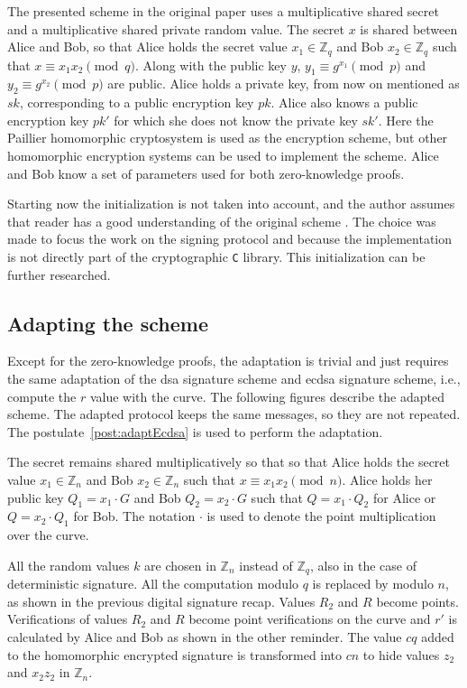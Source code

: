 The presented scheme in the original paper uses a multiplicative shared secret
and a multiplicative shared private random value. The secret $x$ is shared
between Alice and Bob, so that Alice holds the secret value $x_1 \in
\mathbb{Z}_{q}$ and Bob $x_2 \in \mathbb{Z}_{q}$ such that $x \equiv x_1x_2
\pmod q$. Along with the public key $y$, $y_1 \equiv g^{x_1} \pmod p$ and $y_2
\equiv g^{x_2} \pmod p$ are public. Alice holds a private key, from now on
mentioned as $sk$, corresponding to a public encryption key $pk$. Alice also
knows a public encryption key $pk'$ for which she does not know the private key
$sk'$. Here the Paillier homomorphic cryptosystem is used as the encryption
scheme, but other homomorphic encryption systems can be
used to implement the scheme. Alice and Bob know a set of parameters used for
both zero-knowledge proofs.

Starting now the initialization is not taken into account, and the author
assumes that reader has a good understanding of the original scheme
\cite{crypto-2001-1592}. The choice was made to focus the work on the
signing protocol and because the implementation is not directly part of the
cryptographic \texttt{C} library. This initialization can be further researched.

\subsection{Adapting the scheme}

Except for the zero-knowledge proofs, the adaptation is trivial and just requires
the same adaptation of the \gls{dsa} signature scheme and \gls{ecdsa} signature
scheme, i.e., compute the $r$ value with the curve. The following figures
describe the adapted scheme. The adapted protocol keeps the same messages, so
they are not repeated. The postulate~\ref{post:adaptEcdsa} is used to perform
the adaptation.

The secret remains shared multiplicatively so that so that Alice holds the secret
value $x_1 \in \mathbb{Z}_{n}$ and Bob $x_2 \in \mathbb{Z}_{n}$ such that $x
\equiv x_1x_2 \pmod n$. Alice holds her public key $Q_1 = x_1 \cdot G$ and Bob
$Q_2 = x_2 \cdot G$ such that $Q = x_1 \cdot Q_2$ for Alice or $Q = x_2 \cdot
Q_1$ for Bob. The notation $\cdot$ is used to denote the point multiplication
over the curve.

All the random values $k$ are chosen in $\mathbb{Z}_{n}$ instead of
$\mathbb{Z}_{q}$, also in the case of deterministic signature. All the
computation modulo $q$ is replaced by modulo $n$, as shown in the previous
digital signature recap. Values $R_2$ and $R$ become points. Verifications of
values $R_2$ and $R$ become point verifications on the curve and $r'$ is
calculated by Alice and Bob as shown in the other reminder. The value $cq$ added
to the homomorphic encrypted signature is transformed into $cn$ to hide values
$z_2$ and $x_2z_2$ in $\mathbb{Z}_{n}$.

